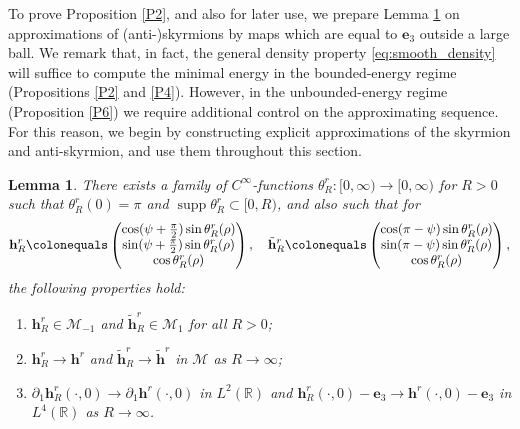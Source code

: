 \documentclass{amsart}
\numberwithin{equation}{section}
\newtheorem{lemma}[theorem]{Lemma}
\theoremstyle{definition}
\theoremstyle{remark}
\newcommand{\R}{\mathbb{R}}
\DeclareMathOperator{\supp}{supp}
\newcommand{\boM}{\mathcal{M}}
\newcommand{\te}{\ensuremath{\theta}}
\newcommand{\rd}{{\partial}}								%
\newcommand{\bh}{{\mathbf{h}}}
\newcommand{\boe}{{\mathbf{e}}}
\begin{document}
To prove Proposition \ref{P2}, and also for later use, we prepare Lemma \ref{L:cptHM} on approximations of (anti-)skyrmions by maps which are equal to $\boe_3$ outside a large ball.
We remark that, in fact, the general density property \eqref{eq:smooth_density} will suffice to compute the minimal energy in the bounded-energy regime (Propositions \ref{P2} and \ref{P4}).
However, in the unbounded-energy regime (Proposition \ref{P6}) we require additional control on the approximating sequence.
For this reason, we begin by constructing explicit approximations of the skyrmion and anti-skyrmion, and use them throughout this section.

\begin{lemma}\label{L:cptHM} 
There exists a family of $C^\infty$-functions $\te^r_R:[0,\infty)\to [0,\infty)$ for $R>0$ such that $\te^r_R(0)=\pi$ and $\supp \te^r_R \subset [0,R)$, and also such that for
\[
\bh^r_R\colonequals \begin{pmatrix}
\cos (\psi+\frac \pi2) \sin \te^r_R(\rho)\\
\sin (\psi+\frac \pi2) \sin \te^r_R(\rho)\\
\cos \te^r_R(\rho)
\end{pmatrix}, \quad
\tilde\bh^r_R \colonequals 
\begin{pmatrix}
\cos (\pi-\psi) \sin \te^r_R(\rho)\\
\sin (\pi -\psi) \sin \te^r_R (\rho)\\
\cos \te^r_R(\rho)
\end{pmatrix},
\]
the following properties hold:
\begin{enumerate}
    \item $\bh^r_R\in \boM_{-1}$ and $\tilde\bh^r_R \in \boM_1$ for all $R>0$;
    \item $\bh^r_R \to \bh^r$ and 
$\tilde\bh^r_R\to \tilde\bh^r$ in $\boM$ as $R\to\infty$;
    \item $\rd_{1} \bh^{r}_{R} (\cdot,0) \to 
\rd_{1} \bh^{r} (\cdot,0)$ in $L^2(\R)$  and $\bh^{r}_{R} (\cdot,0)-\boe_3 \to 
\bh^{r} (\cdot,0) -\boe_3$ in $L^4(\R)$ as $R\to\infty$.
\end{enumerate}

\end{lemma}
\end{document}
